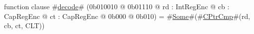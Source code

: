 function clause #\hyperref[zdecode]{decode}# (0b010010 @ 0b01110 @ rd : IntRegEnc @ cb : CapRegEnc @ ct : CapRegEnc @ 0b000 @ 0b010) = #\hyperref[zSome]{Some}#(#\hyperref[zCPtrCmp]{CPtrCmp}#(rd, cb, ct, CLT))
